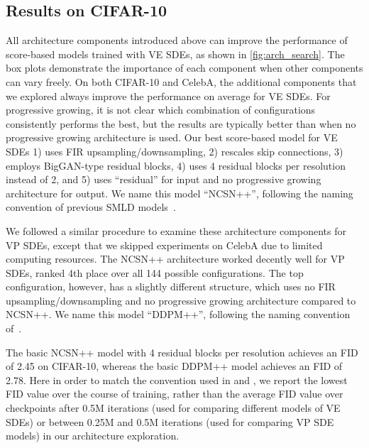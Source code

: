 \documentclass{article} \usepackage{iclr2021_conference,times}
\begin{document}
\subsection{Results on CIFAR-10}\label{app:rescifar10} 

All architecture components introduced above can improve the performance of score-based models trained with VE SDEs, as shown in \cref{fig:arch_search}. The box plots demonstrate the importance of each component when other components can vary freely. On both CIFAR-10 and CelebA, the additional components that we explored always improve the performance on average for VE SDEs. For progressive growing, it is not clear which combination of configurations consistently performs the best, but the results are typically better than when no progressive growing architecture is used. Our best score-based model for VE SDEs 1) uses FIR upsampling/downsampling, 2) rescales skip connections, 3) employs BigGAN-type residual blocks, 4) uses 4 residual blocks per resolution instead of 2, and 5) uses ``residual'' for input and no progressive growing architecture for output. We name this model ``NCSN++'', following the naming convention of previous SMLD models~\citep{song2019generative,song2020improved}. 

We followed a similar procedure to examine these architecture components for VP SDEs, except that we skipped experiments on CelebA due to limited computing resources. The NCSN++ architecture worked decently well for VP SDEs, ranked 4th place over all 144 possible configurations. The top configuration, however, has a slightly different structure, which uses no FIR upsampling/downsampling and no progressive growing architecture compared to NCSN++. We name this model ``DDPM++'', following the naming convention of~\citet{ho2020denoising}.


The basic NCSN++ model with 4 residual blocks per resolution achieves an FID of 2.45 on CIFAR-10, whereas the basic DDPM++ model achieves an FID of 2.78. Here in order to match the convention used in \citet{karras2018progressive,song2019generative} and \citet{ho2020denoising}, we report the lowest FID value over the course of training, rather than the average FID value over checkpoints after 0.5M iterations (used for comparing different models of VE SDEs) or between 0.25M and 0.5M iterations (used for comparing VP SDE models) in our architecture exploration. 
\end{document}
